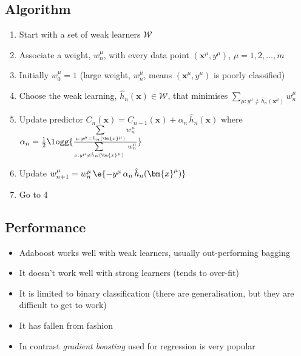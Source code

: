 \begin{slide}
\section[-2]{Algorithm}

\begin{PauseHighLight}
  \small
  \begin{enumerate}
  \item Start with a set of weak learners $\mathcal{W}$\pause
  \item Associate a weight, $w_n^\mu$, with every data point
    $(\bm{x}^\mu, y^\mu)$, $\mu=1,2,\ldots,m$\pause
  \item Initially $w_0^\mu=1$\pause{} (large weight, $w_n^\mu$, means
    $(\bm{x}^\mu, y^\mu)$ is poorly classified)\pauseb
  \item Choose the weak learning, $\hat{h}_n(\bm{x})\in\mathcal{W}$, that minimises
    $\sum\limits_{\mu:y^\mu\neq \hat{h}_n(\bm{x}^\mu)}\!\!\!
    w_n^\mu$\pause
  \item Update predictor $C_n(\bm{x}) = C_{n-1}(\bm{x}) + \alpha_n \,
    \hat{h}_n(\bm{x})$ where $\alpha_n=  \frac{1}{2} \logg{\frac{\sum\limits_{\mu:y^\mu=
      \hat{h}_n(\bm{x}^\mu)}  w_n^\mu}{
                \sum\limits_{\mu:y^\mu\neq \hat{h}_n(\bm{x}^\mu)}\ w_n^\mu}}$\pause
  \item Update $w_{n+1}^\mu = w_{n}^\mu\, \e{-y^\mu\, \alpha_n \, \hat{h}_n(\bm{x}^\mu)}$\pause
  \item Go to 4\pause
  \end{enumerate}
\end{PauseHighLight}

\end{slide}



\begin{slide}
\section{Performance}

\begin{PauseHighLight}
  \begin{itemize}
  \item Adaboost works well with weak learners, usually out-performing
    bagging\pause
  \item It doesn't work well with strong learners (tends to
    over-fit)\pause
  \item It is limited to binary classification (there are
    generalisation, but they are difficult to get to work)\pause
  \item It has fallen from fashion\pause
  \item In contrast \emph{gradient boosting} used for regression is
    very popular\pause
  \end{itemize}
\end{PauseHighLight}

\end{slide}

